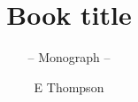\documentclass[graybox,envcountchap,sectrefs]{style/svmono}
\begin{document}
\author{E Thompson}
\title{Book title}
\subtitle{-- Monograph --}
\maketitle

\frontmatter%






\tableofcontents




\mainmatter%




\backmatter%



\printindex

\end{document}
